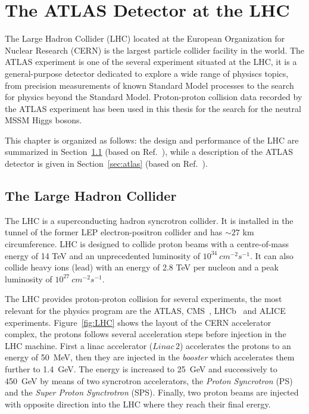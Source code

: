 \chapter{The ATLAS Detector at the LHC}\label{chap:detector}
 \vspace{0.5cm}

The Large Hadron Collider (LHC) located at the European Organization for Nuclear Research (CERN)
is  the largest particle collider facility in the world. The ATLAS experiment is one of the several experiment situated 
at the LHC, it is a general-purpose detector dedicated to explore a wide range of physiscs topics, from
precision measurements of known Standard Model processes to the search for physics beyond the Standard Model. 
Proton-proton collision data recorded by the ATLAS experiment  has been used in this thesis 
for the search for the neutral MSSM Higgs bosons.

This chapter is organized as follows: the design and performance of the LHC  are summarized in 
Section~\ref{sec:lhc} (based on Ref.~\cite{LHC}),  while a description of the  ATLAS detector  is given 
in Section~\ref{sec:atlas} (based on Ref.~\cite{ATLASDetector}).


\restoregeometry
\clearpage



\section{The Large Hadron Collider}\label{sec:lhc}
The LHC is a superconducting hadron syncrotron  collider. It is  installed in the tunnel of the former LEP electron-positron collider
and has $\sim 27$ km circumference.
LHC is designed to collide proton beams with a centre-of-mass energy of 14 TeV and an unprecedented luminosity of 
$10^{34} ~ cm^{-2} s^{-1}$. It can also collide heavy ions (lead) with an energy of 2.8 TeV per nucleon and 
a peak luminosity of $10^{27} ~ cm^{-2} s^{-1}$. 

The LHC provides proton-proton collision for several experiments, the most relevant for the physics program  are the ATLAS, CMS~\cite{cms},
LHCb~\cite{lhcb} and ALICE~\cite{alice} experiments. 
Figure~\ref{fig:LHC} shows the layout of the CERN accelerator complex, the  protons follows several acceleration steps before injection in the LHC machine.
First a linac accelerator ($Linac\,2$) accelerates the protons to an energy of 50~MeV, then they are injected in the \emph{booster} which accelerates them
further to 1.4~GeV. The energy is increased to 25~GeV and successively to 450~GeV by means of two syncrotron accelerators, the \emph{Proton Syncrotron} (PS)
and the \emph{Super Proton Synctrotron} (SPS). Finally, two proton beams are  injected with opposite direction into the LHC 
where they reach their final erergy.


